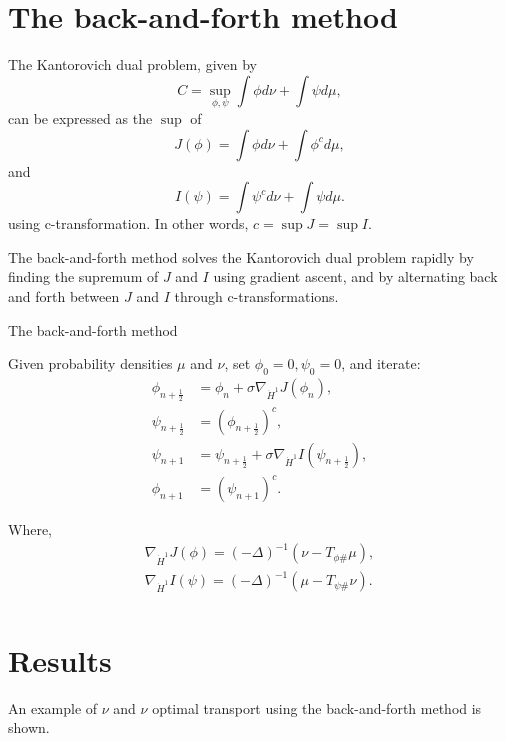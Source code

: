 \documentclass[a4j,10pt, twocolumn, dvipdfmx]{article}
\theoremstyle{definition}
\begin{document}
\section{The back-and-forth method}
The Kantorovich dual problem, given by
\begin{equation*}
    C = \sup_{\phi, \psi} \int \phi d\nu + \int \psi d\mu,
\end{equation*}
can be expressed as the $\sup$ of 
\begin{equation*}
    J(\phi) = \int \phi d \nu + \int \phi^c d \mu,
\end{equation*}
and 
\begin{equation*}
    I(\psi) = \int \psi^c d \nu + \int \psi d \mu.
\end{equation*}
using c-transformation. In other words, $c = \sup J = \sup I$.

The back-and-forth method solves the Kantorovich dual problem rapidly by finding the supremum of $J$ and $I$ using gradient ascent, 
and by alternating back and forth between $J$ and $I$ through c-transformations.

\begin{algorithm}
    \caption{The back-and-forth method}
    \begin{algorithmic}
        \State Given probability densities $\mu$ and $\nu$, set $\phi_0 = 0, \psi_0 = 0$, and iterate:
        \State \begin{align*}
            \phi_{n + \frac{1}{2}} &= \phi_{n} + \sigma \nabla_{\dot{H}^1} J(\phi_{n}),\\
            \psi_{n + \frac{1}{2}} &= (\phi_{n + \frac{1}{2}})^c,\\
            \psi_{n + 1} &= \psi_{n + \frac{1}{2}} + \sigma \nabla_{\dot{H}^1} I(\psi_{n + \frac{1}{2}}),\\
            \phi_{n + 1} &= (\psi_{n + 1})^c.
        \end{align*}
    \end{algorithmic}
\end{algorithm}

Where,
\begin{align*}
    \nabla_{\dot{H}^1} J(\phi) = (- \Delta)^{-1} (\nu - T_{\phi \#} \mu),\\
    \nabla_{\dot{H}^1} I(\psi) = (- \Delta)^{-1} (\mu - T_{\psi \#} \nu).\\
\end{align*}

\section{Results}
An example of $\nu$ and $\nu$ optimal transport using the back-and-forth method is shown.
\end{document}
